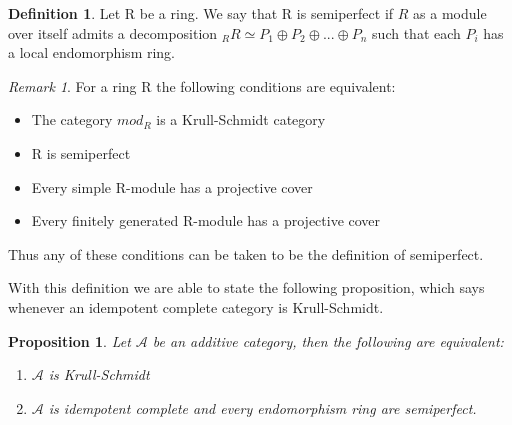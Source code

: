 \documentclass[11pt]{article}
\newtheorem{prop}[theorem]{Proposition}
\theoremstyle{definition}
\newtheorem{definition}{Definition}[section]
\theoremstyle{remark}
\newtheorem*{remark}{Remark}
\begin{document}
            \begin{definition}
                Let R be a ring. We say that R is semiperfect if $R$ as a module over itself admits a decomposition $_RR\simeq P_1\oplus P_2\oplus ... \oplus P_n$ such that each $P_i$ has a local endomorphism ring.
            \end{definition}

            \begin{remark}
                For a ring R the following conditions are equivalent:
                \begin{itemize}
                    \item The category $mod_R$ is a Krull-Schmidt category
                    \item R is semiperfect
                    \item Every simple R-module has a projective cover
                    \item Every finitely generated R-module has a projective cover
                \end{itemize}
                Thus any of these conditions can be taken to be the definition of semiperfect.
            \end{remark}

            With this definition we are able to state the following proposition, which says whenever an idempotent complete category is Krull-Schmidt.

            \begin{prop}
                Let $\mathcal{A}$ be an additive category, then the following are equivalent:
                \begin{enumerate}
                    \item $\mathcal{A}$ is Krull-Schmidt
                    \item $\mathcal{A}$ is idempotent complete and every endomorphism ring are semiperfect.
                \end{enumerate}
            \end{prop}


\end{document}
